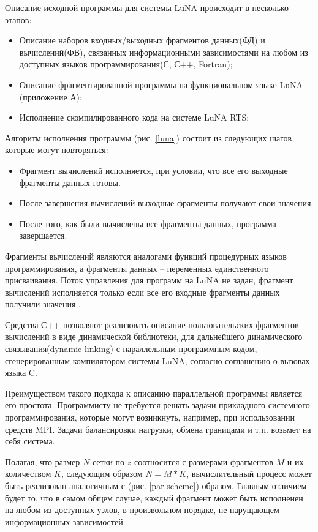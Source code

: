 Описание исходной программы для системы LuNA происходит в несколько этапов:

\begin{itemize}
    \item Описание наборов входных/выходных фрагментов данных(ФД) и вычислений(ФВ), связанных информационными зависимостями
на любом из доступных языков программирования(С, С++, Fortran);
    \item Описание фрагментированной программы на функциональном языке LuNA (приложение А);
    \item Исполнение скомпилированного кода на системе LuNA RTS;
\end{itemize}

Алгоритм исполнения программы (рис. \ref{luna}) состоит из следующих шагов, которые могут повторяться:
\begin{itemize}
    \item Фрагмент вычислений исполняется, при условии, что все его выходные фрагменты данных готовы.
    \item После завершения вычислений выходные фрагменты получают свои значения.
    \item После того, как были вычислены все фрагменты данных, программа завершается.
\end{itemize}


Фрагменты вычислений являются аналогами функций процедурных языков программирования,
а фрагменты данных – переменных единственного присваивания.
Поток управления для программ на LuNA не задан, фрагмент вычислений исполняется только если все его входные фрагменты данных получили значения \cite{mach}.

Средства С++ позволяют реализовать описание пользовательских фрагментов-вычислений в виде динамической библиотеки,
для дальнейшего динамического связывания(dynamic linking) с параллельным программным кодом, сгенерированным компилятором системы LuNA,
согласно соглашению о вызовах языка C.

Преимуществом такого подхода к описанию параллельной программы является его простота. Программисту
не требуется решать задачи прикладного системного программирования, которые могут возникнуть, например, при использовании средств MPI.
Задачи балансировки нагрузки, обмена границами и т.п. возьмет на себя система.

Полагая, что размер $N$ сетки по $z$ соотносится с размерами фрагментов $M$ и их количеством $K$,
следующим образом $N = M * K$, вычислительный процесс может быть реализован аналогичным с (рис. \ref{par-scheme}) образом.
Главным отличием будет то, что в самом общем случае, каждый фрагмент может быть исполненен на любом из доступных узлов,
в произвольном порядке, не нарущающем информационных зависимостей.

